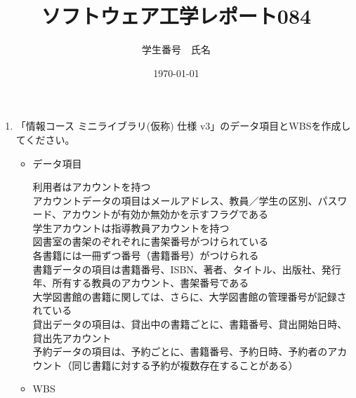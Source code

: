 \documentclass[a4paper]{jarticle}
\title{ソフトウェア工学レポート084}
\author{学生番号　氏名}
\date{\today}
\begin{document}
\maketitle
\begin{enumerate}
 \renewcommand{\labelenumi}{(\arabic{enumi})}
 \item 「情報コース ミニライブラリ(仮称) 仕様 v3」のデータ項目とWBSを作成してください。
 \begin{itemize}
  \item データ項目\\

利用者はアカウントを持つ\\
アカウントデータの項目はメールアドレス、教員／学生の区別、パスワード、アカウントが有効か無効かを示すフラグである\\
学生アカウントは指導教員アカウントを持つ\\
図書室の書架のぞれぞれに書架番号がつけられている\\
各書籍には一冊ずつ番号（書籍番号）がつけられる\\
書籍データの項目は書籍番号、ISBN、著者、タイトル、出版社、発行年、所有する教員のアカウント、書架番号である\\
大学図書館の書籍に関しては、さらに、大学図書館の管理番号が記録されている\\
貸出データの項目は、貸出中の書籍ごとに、書籍番号、貸出開始日時、貸出先アカウント\\
予約データの項目は、予約ごとに、書籍番号、予約日時、予約者のアカウント（同じ書籍に対する予約が複数存在することがある）\\
  \item WBS\\

\end{itemize}
\end{enumerate}
\end{document}
